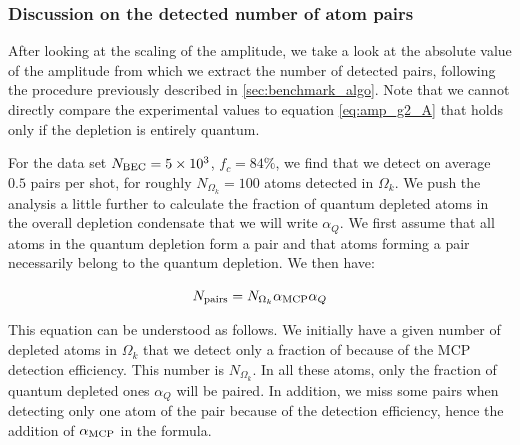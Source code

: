 \subsubsection{Discussion on the detected number of atom pairs}

After looking at the scaling of the amplitude, we take a look at the absolute value of the amplitude from which we extract the number of detected \kmk pairs, following the procedure previously described in \ref{sec:benchmark_algo}. Note that we cannot directly compare the experimental values to equation \ref{eq:amp_g2_A} that holds only if the depletion is entirely quantum.


For the data set $N_{\rm{BEC}}=5 \times 10^3$, $f_c=84 \%$, we find that we detect on average $0.5$ pairs per shot, for roughly $N_{\Omega_k}=100$ atoms detected in $\Omega_k$. We push the analysis a little further to calculate the fraction of quantum depleted atoms in the overall depletion condensate that we will write $\alpha_Q$. We first assume that all atoms in the quantum depletion form a \kmk pair and that atoms forming a \kmk pair necessarily belong to the quantum depletion. We then have:

\begin{equation}
    N_{\rm{pairs}}= N_{\Omega_k} \alpha_{\rm{MCP}} \alpha_Q
    \label{eq:Npairs}
\end{equation}

\noindent This equation can be understood as follows. We initially have a given number of depleted atoms in $\Omega_k$ that we detect only a fraction of because of the MCP detection efficiency. This number is $N_{\Omega_k}$. In all these atoms, only the fraction of quantum depleted ones $\alpha_Q$ will be \kmk paired. In addition, we miss some pairs when detecting only one atom of the pair because of the detection efficiency, hence the addition of $\alpha_{\rm{MCP}}$ in the formula.

